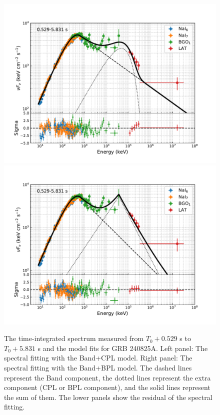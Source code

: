 \documentclass[twocolumn]{aastex631}
\begin{document}
\begin{figure}
\includegraphics[angle=0,scale=0.47]{SED1.pdf}
\hspace{-0.6cm}
\includegraphics[angle=0,scale=0.47]{SED2.pdf}\\
\caption{ The time-integrated spectrum measured from $T_0+0.529$ s to
$T_0 + 5.831$ s and the model fits for GRB 240825A. Left panel: The spectral fitting with the Band+CPL model. 
Right panel: The spectral fitting with the Band+BPL model. 
The dashed lines represent the Band component, the dotted lines represent the extra component (CPL or BPL component), and the solid lines represent the sum of them. The lower panels show the residual of the spectral fitting.
}
\label{fig:spec_all}
\end{figure}
\end{document}
